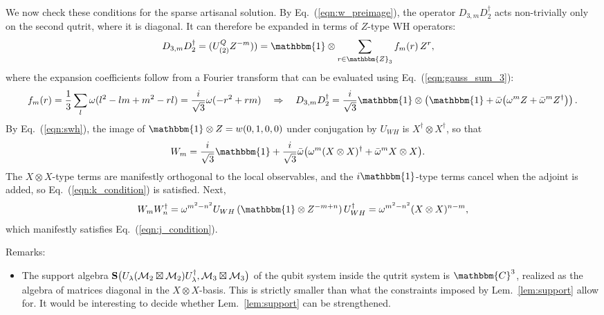 \documentclass[aps,nofootinbib,floatfix,a4paper]{revtex4}
\newcommand{\1}{\mbox{$\mathbf{1}$}}
\def\Spp{{\bf S}}
\def\ZZ{\mathbbm{Z}}
\def\CC{\mathbbm{C}}
\def\M{\mathcal{M}}
\def\Id{\mathbbm{1}}
\begin{document}
We now check these conditions for the sparse artisanal solution.
By Eq.~(\ref{eqn:w_preimage}), the operator
$D_{3,m} D_2^\dagger$ 
acts non-trivially only on the second qutrit, where it is diagonal.
It can therefore be expanded in terms of $Z$-type WH operators:
\begin{align}\label{eqn:wm_exp}
	D_{3,m} D_2^\dagger
	=
	(U^Q_{(2)} Z^{-m}))
	&=
	\Id\otimes
	\sum_{r\in\ZZ_3} f_m(r) \, Z^r, %
\end{align}
where the expansion coefficients follow from a Fourier transform that can be evaluated using Eq.~(\ref{eqn:gauss_sum_3}):
\begin{align}\label{eqn:wm_ft}
	&&
	f_m(r)
	&=
	\frac13
	\sum_{l} \omega(l^2 -lm +m^2- rl)
	=
	\frac{i}{\sqrt 3} \omega(-r^2+rm)
	\quad\Rightarrow\quad
	D_{3,m} D_2^\dagger
	=
	\frac{i}{\sqrt 3} 
	\Id\otimes
	\left(
		\Id
		+
		\bar
		\omega
		\big(
			\omega^m Z + \bar\omega^{m} Z^\dagger
		\big)
	\right).
\end{align}
By
Eq.~(\ref{eqn:swh}),
the image of $\Id \otimes Z = w(0,1,0,0)$ 
under conjugation by $U_{WH}$
is 
$X^\dagger\otimes X^\dagger$, so that
\begin{align}\label{eqn:wm}
	W_{m}
	&=
	\frac{i}{\sqrt 3} 
		\Id
		+
	\frac{i}{\sqrt 3} 
	\bar\omega
		\big(
			\omega^m (X\otimes X)^\dagger + \bar\omega^m X\otimes X
		\big)
		.
\end{align}
The $X\otimes X$-type terms are manifestly orthogonal to the local observables,
and the $i\Id$-type terms cancel when the adjoint is added, so Eq.~(\ref{eqn:k_condition}) is satisfied.
Next,
\begin{align}\label{eqn:artisanal_k_type}
	W_m W_n^\dagger
	=
	\omega^{m^2-n^2}
	U_{WH}
	\,
	(
		\Id
		\otimes
		Z^{-m+n}
	)
	\, U_{WH}^\dagger 
	=
	\omega^{m^2-n^2}
	(X\otimes X)^{n-m},
\end{align}
which manifestly satisfies Eq.~(\ref{eqn:j_condition}).

Remarks:
\begin{itemize}
	\item
		The support algebra  
		$
		\Spp\big(
			U_\lambda (\M_2\boxtimes \M_2) U_\lambda^\dagger,
			\M_3 \boxtimes \M_3
		\big)
		$
		of the qubit system inside the qutrit system is $\CC^3$, realized as the algebra of matrices diagonal in the $X\otimes X$-basis.
		This is strictly smaller than what the constraints imposed by Lem.~\ref{lem:support} allow for.
		It would be interesting to decide whether Lem.~\ref{lem:support} can be strengthened.
\end{itemize}
\end{document}
